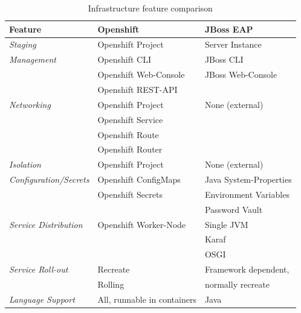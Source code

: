 {\renewcommand{\arraystretch}{1.2}%
\begin{table}[h]
	\begin{tabularx}{\textwidth}{ X|X|X }	
	  \textbf{Feature}                  & \textbf{Openshift}         & \textbf{JBoss EAP} \\  \hline
	  \textit{Staging}                  & Openshift Project          & Server Instance \\  \hline
	  \textit{Management}               & Openshift CLI              & JBoss CLI \\
	                                    & Openshift Web-Console      & JBoss Web-Console \\
	                                    & Openshift REST-API         & \\  \hline
	  \textit{Networking}               & Openshift Project          & None (external) \\
	                                    & Openshift Service          & \\  
	                                    & Openshift Route            & \\  
	                                    & Openshift Router           & \\  \hline
	  \textit{Isolation}                & Openshift Project          & None (external) \\  \hline
	  \textit{Configuration/Secrets}    & Openshift ConfigMaps       & Java System-Properties  \\
	                                    & Openshift Secrets          & Environment Variables \\
	                                                                && Password Vault \\  \hline
	  \textit{Service Distribution}     & Openshift Worker-Node      & Single JVM \\ 
			                                                        && Karaf \\  
			                                                        && OSGI \\  \hline
	  \textit{Service Roll-out}         & Recreate                   & Framework dependent, \\ 
			                            & Rolling                    & normally recreate \\ \hline
	  \textit{Language Support}         & All, runnable in containers & Java \\
	\end{tabularx}
	\caption{Infrastructure feature comparison}
	\label{tab:esbd-multi-stage-env}
\end{table}}

